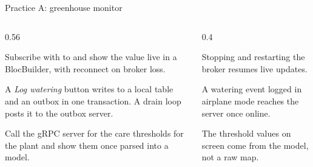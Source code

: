 \documentclass[10pt,aspectratio=169,t]{beamer}
\begin{document}
\begin{frame}[embedded,eyebrow=Practice A]{Practice A: greenhouse monitor}
  \vskip 2mm
  \begin{columns}[T]
    \begin{column}{0.56\textwidth}
      \begin{steps}
        \item Subscribe with  to  and show the value live in a BlocBuilder, with reconnect on broker loss.
        \item A \emph{Log watering} button writes to a local table and an outbox in one transaction. A drain loop posts it to the outbox server.
        \item Call the gRPC server for the care thresholds for the plant and show them once parsed into a model.
      \end{steps}
    \end{column}
    \begin{column}{0.4\textwidth}
      \begin{checklist}
        \item Stopping and restarting the broker resumes live updates.
        \item A watering event logged in airplane mode reaches the server once online.
        \item The threshold values on screen come from the model, not a raw map.
      \end{checklist}
    \end{column}
  \end{columns}
\end{frame}
\end{document}

